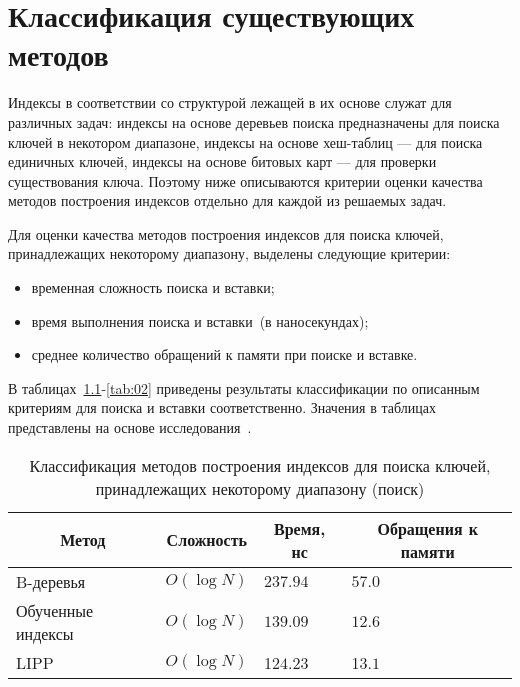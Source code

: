 \chapter{Классификация существующих методов\label{classification}}

Индексы в соответствии со структурой лежащей в их основе служат для различных
задач: индексы на основе деревьев поиска предназначены для поиска ключей в
некотором диапазоне, индексы на основе хеш-таблиц --- для поиска единичных
ключей, индексы на основе битовых карт --- для проверки существования ключа.
Поэтому ниже описываются критерии оценки качества методов построения индексов
отдельно для каждой из решаемых задач.

Для оценки качества методов построения индексов для поиска ключей, принадлежащих
некоторому диапазону, выделены следующие критерии:
\begin{itemize}
    \item временная сложность поиска и вставки;
    \item время выполнения поиска и вставки~(в наносекундах);
    \item среднее количество обращений к памяти при поиске и вставке.
\end{itemize}

В таблицах~\ref{tab:01}-\ref{tab:02} приведены результаты классификации по
описанным критериям для поиска и вставки соответственно. Значения в таблицах
представлены на основе исследования~\cite{ulipp}.

{
\captionsetup{format=hang,justification=raggedleft,
              singlelinecheck=off,width=17cm}
\begin{longtable}[Hc]{|p{5cm}|p{2cm}|p{2cm}|p{2cm}|}
\caption{Классификация методов построения индексов для поиска ключей,
принадлежащих некоторому диапазону (поиск)\label{tab:01}}\\
    \hline
    \multicolumn{1}{|c|}{\textbf{Метод}} &
    \multicolumn{1}{c|}{\textbf{Сложность}} &
    \multicolumn{1}{c|}{\textbf{Время, нс}} &
    \multicolumn{1}{c|}{\parbox{3cm}{\vspace{2mm}\centering\textbf{Обращения к
    памяти}}}\\[2.5ex]
    \hline
    B-деревья & $O(\log N)$
    & $237.94$
    & $57.0$\\
    \hline
    Обученные индексы & $O(\log N)$
    & $139.09$
    & $12.6$\\
    \hline
    LIPP & $O(\log N)$
         & \color{white}1\color{black}$24.23$
    & \color{white}1\color{black}$3.1$\\
    \hline
\end{longtable}
}

